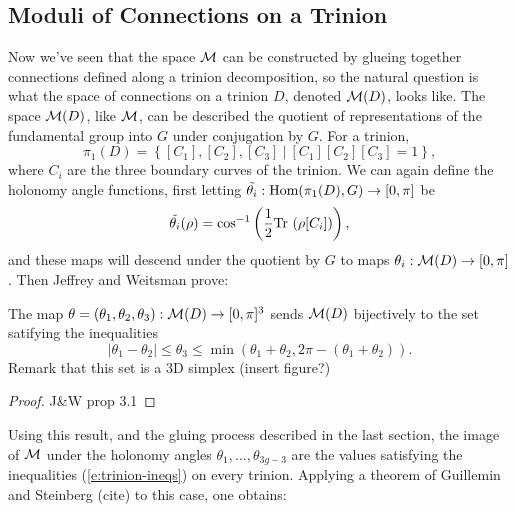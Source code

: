 \subsection{Moduli of Connections on a Trinion}
 	Now we've seen that the space $\mathcal{M}$ can be constructed by glueing together connections defined along a trinion decomposition, so the natural question is what the space of connections on a trinion $D$, denoted $\mathcal{M}(D)$, looks like. The space $\mathcal{M}(D)$, like $\mathcal{M}$, can be described the quotient of representations of the fundamental group into $G$ under conjugation by $G$. For a trinion, 
	\begin{equation}
		\pi_1(D) = \left\{
		[C_1], [C_2], [C_3] ~|~ [C_1][C_2][C_3]  =1
		\right\},
	\end{equation}
	where $C_i$ are the three boundary curves of the trinion. We can again define the holonomy angle functions, first letting $\tilde{\theta_i}:\text{Hom}(\pi_1(D),G) \to [0,\pi]$ be
	\begin{equation}
		\label{e:thetacoords}
		\tilde{\theta_i}(\rho) = \cos^{-1}\left(\frac{1}{2}\text{Tr }(\rho[C_i])\right),
	\end{equation}
	and these maps will descend under the quotient by $G$ to maps $\theta_i:\mathcal{M}(D)\to [0,\pi]$. Then Jeffrey and Weitsman prove:
	\begin{theorem}
		The map $\theta = (\theta_1, \theta_2, \theta_3):\mathcal{M}(D)\to[0,\pi]^3$ sends $\mathcal{M}(D)$ bijectively to the set satifying the inequalities
		\begin{equation}
			|\theta_1 - \theta_2| \leq \theta_3 \leq \min(\theta_1 + \theta_2, 2\pi - (\theta_1 + \theta_2)).
			\label{e:trinion-ineqs}
		\end{equation}
		Remark that this set is a 3D simplex (insert figure?)
	\end{theorem}
	\begin{proof}
		J\&W prop 3.1
	\end{proof}
	Using this result, and the gluing process described in the last section, the image of $\mathcal{M}$ under the holonomy angles $\theta_1,...,\theta_{3g-3}$ are the values satisfying the inequalities (\ref{e:trinion-ineqs}) on every trinion. Applying a theorem of Guillemin and Steinberg (cite) to this case, one obtains:
